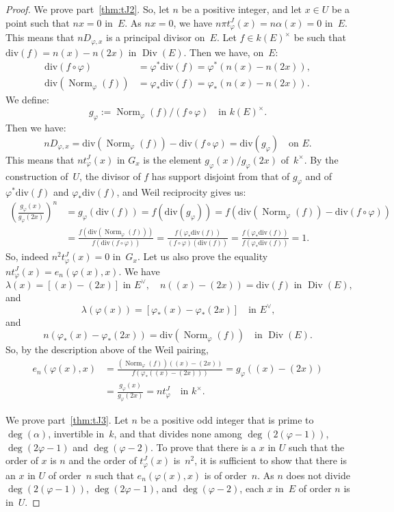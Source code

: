 \documentclass[11pt]{article}
\let\oldvee\vee
\renewcommand{\vee}{{\scriptscriptstyle\oldvee}}
\theoremstyle{plain}
\theoremstyle{definition}
\numberwithin{equation}{subsection}
\let\phi\varphi
\newcommand{\divisor}{\mathrm{div}}
\DeclareMathOperator{\Div}{Div}
\DeclareMathOperator{\Norm}{Norm}
\begin{document}
\begin{proof}
We prove part~\eqref{thm:tJ2}. So, let $n$ be a positive integer, and let $x\in U$
be a point such that $nx=0$ in~$E$. As $nx=0$, we have $n\pi
t^J_\phi(x)=n \alpha(x)=0$ in~$E$. This means that $nD_{\phi,x}$ is a
principal divisor on~$E$. Let $f\in k(E)^\times$ be such that
$\divisor(f)=n(x)-n(2x)$ in $\Div(E)$. Then we have, on~$E$:
\begin{align*}
\divisor(f\circ \phi) & = \phi^*\divisor(f) = \phi^*\left(n(x)-n(2x)\right),\\
\divisor(\Norm_\phi(f)) & = \phi_*\divisor(f) = \phi_*\left(n(x)-n(2x)\right).
\end{align*}
We define:
\[
g_\phi:=\Norm_\phi(f)/(f\circ \phi)\quad\text{in $k(E)^\times$.}
\]
Then we have:
\[
nD_{\phi,x} = \divisor(\Norm_\phi(f)) - \divisor(f\circ \phi) = \divisor(g_\phi)
\quad\text{on~$E$.}
\]
This means that $nt^J_\phi(x)$ in $G_x$ is the element $g_\phi(x)/g_\phi(2x)$ of~$k^\times$. By the
construction of~$U$, the divisor of $f$ has support disjoint from that of $g_\phi$ and of
$\phi^*\divisor(f)$ and $\phi_*\divisor(f)$, and Weil reciprocity gives us:
\begin{align*}
\left(\frac{g_\phi(x)}{g_\phi(2x)}\right)^n & = g_\phi(\divisor(f)) =
f(\divisor(g_\phi)) = f(\divisor(\Norm_\phi(f)) - \divisor(f\circ \phi))\\
& = \frac{f(\divisor(\Norm_\phi(f)))}{f(\divisor(f\circ \phi))} =
\frac{f(\phi_*\divisor(f))}{(f\circ \phi)(\divisor(f))} =
\frac{f(\phi_*\divisor(f))}{f(\phi_*\divisor(f))} = 1.
\end{align*}
So, indeed $n^2 t^J_\phi(x)=0$ in~$G_x$. Let us also
prove the equality $nt^J_\phi(x) = e_n(\phi(x),x)$. We have
\[
\text{$\lambda(x) = [(x)-(2x)]$ in $E^\vee$},\quad
\text{$n((x)-(2x)) =\divisor(f)$ in $\Div(E)$,}
\]
and
\[
\lambda(\phi(x)) = [\phi_*(x)-\phi_*(2x)] \quad\text{in $E^\vee$,}
\]
and
\[
n(\phi_*(x)-\phi_*(2x)) = \divisor(\Norm_\phi(f)) \quad \text{in $\Div(E)$}.
\]
So, by the description above of the Weil pairing,
\begin{align*}
e_n(\phi(x),x) & = \frac{(\Norm_\phi(f))((x) - (2x))}{f(\phi_*((x) - (2x)))} = g_\phi((x) - (2x)) \\
& = \frac{g_\phi(x)}{g_\phi(2x)} = nt^J_\phi \quad\text{in $k^\times$.}
\end{align*}

We prove part~\eqref{thm:tJ3}. Let $n$ be a positive odd integer that is prime to
$\deg(\alpha)$, invertible in~$k$, and that divides none among
$\deg(2(\phi-1))$, $\deg(2\phi-1)$ and $\deg(\phi-2)$. To prove that
there is a $x$ in $U$ such that the order of $x$ is $n$ and the order
of $t^J_\phi(x)$ is~$n^2$, it is sufficient to show that there is an
$x$ in $U$ of order~$n$ such that $e_n(\phi(x),x)$ is of order~$n$. As
$n$ does not divide $\deg(2(\phi-1))$, $\deg(2\phi-1)$, and
$\deg(\phi-2)$, each $x$ in~$E$ of order $n$ is in~$U$.


\end{proof}
\end{document}
